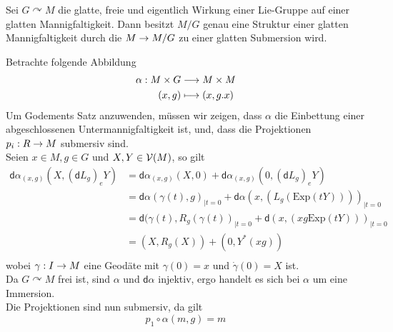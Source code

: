 \documentclass{book}
\renewcommand{\d}{\textsf{d}}
\begin{document}
\Satz{}
Sei $G \curvearrowright M$ die glatte, freie und eigentlich Wirkung einer Lie-Gruppe auf einer glatten Mannigfaltigkeit. Dann besitzt $M/G$ genau eine Struktur einer glatten Mannigfaltigkeit durch die $M\overset{}{\rightarrow} M/G$ zu einer glatten Submersion wird.
\begin{Beweis}{}
Betrachte folgende Abbildung
\begin{align*}
\alpha : M \times G & \overset{}{\longrightarrow} M \times M\\
(x,g) & \longmapsto (x, g.x)
\end{align*}
Um Godements Satz anzuwenden, müssen wir zeigen, dass $\alpha$ die Einbettung einer abgeschlossenen Untermannigfaltigkeit ist, und, dass die Projektionen $p_i : R \overset{}{\rightarrow} M$ submersiv sind.\\
Seien $x \in M,g\in G$ und $X,Y\in \mathcal{V}(M)$, so gilt
\begin{align*}
\d \alpha_{(x,g)}(X,(\d L_g)_e Y) &= \d \alpha_{(x,g)}(X,0) +\d \alpha_{(x,g)}(0,(\d L_g)_e Y)\\
&= \d \alpha(\gamma(t),g)_{|t = 0} +\d \alpha(x,( L_g(\text{Exp}(tY))))_{|t = 0}\\
&= \d (\gamma(t),R_g(\gamma(t))_{|t = 0} +\d (x,( xg\text{Exp}(tY)))_{|t = 0}\\
&=  (X,R_g(X)) + (0,Y^*(xg))\\
\end{align*}
wobei $\gamma : I \overset{}{\rightarrow} M$ eine Geodäte mit $\gamma(0) = x$ und $\dot{\gamma}(0) = X$ ist.\\
Da $G\curvearrowright M$ frei ist, sind $\alpha$ und $\d \alpha$ injektiv, ergo handelt es sich bei $\alpha$ um eine Immersion.\\
Die Projektionen sind nun submersiv, da gilt
\[p_1 \circ \alpha(m,g) = m \]
\end{Beweis}
\end{document}
